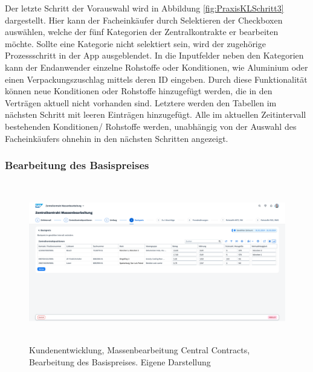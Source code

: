 Der letzte Schritt der Vorauswahl wird in Abbildung \ref{fig:PraxisKLSchritt3} dargestellt. Hier kann der Facheinkäufer durch Selektieren der Checkboxen auswählen, welche der fünf Kategorien der Zentralkontrakte er bearbeiten möchte. Sollte eine Kategorie nicht selektiert sein, wird der zugehörige Prozessschritt in der App ausgeblendet. In die Inputfelder neben den Kategorien kann der Endanwender einzelne Rohstoffe oder Konditionen, wie \zB Aluminium oder einen Verpackungszuschlag mittels deren ID eingeben. Durch diese Funktionalität können neue Konditionen oder Rohstoffe hinzugefügt werden, die in den Verträgen aktuell nicht vorhanden sind. Letztere werden den Tabellen im nächsten Schritt mit leeren Einträgen hinzugefügt. Alle im aktuellen Zeitintervall bestehenden Konditionen/ Rohstoffe werden, unabhängig von der Auswahl des Facheinkäufers ohnehin in den nächsten Schritten angezeigt. 

\subsubsection{Bearbeitung des Basispreises}

\begin{figure}[H]
    \centering
    \includegraphics[height=6.99cm]{Bilder/Praxisteil-KL-Schritt-4.png}
    \caption[Kundenentwicklung, Massenbearbeitung Central Contracts, Bearbeitung des Basispreises]{Kundenentwicklung, Massenbearbeitung Central Contracts, Bearbeitung des Basispreises. Eigene Darstellung}
    \label{fig:PraxisKLSchritt4}
\end{figure}

